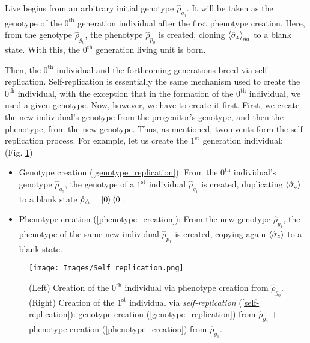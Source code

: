 \documentclass[11pt]{article}
\numberwithin{equation}{section} %
\numberwithin{figure}{section} %
\begin{document}
Live begins from an arbitrary initial genotype $\hat{\rho}_{g_0}$. It will be taken as the genotype of the $0^{\textrm{th}}$ generation individual after the first {\color{orange}phenotype creation}. Here, from the genotype $\hat{\rho}_{g_0}$, the phenotype $\hat{\rho}_{p_0}$ is created, cloning $\braket{\hat{\sigma}_z}_{g_0}$ to a blank state. With this, the $0^{\textrm{th}}$ generation living unit is born.

Then, the $0^{\textrm{th}}$ individual and the forthcoming generations breed via self-replication. Self-replication is essentially the same mechanism used to create the $0^{\textrm{th}}$ individual, with the exception that in the formation of the $0^{\textrm{th}}$ individual, we used a given genotype. Now, however, we have to create it first. First, we create the new individual's genotype from the progenitor's genotype, and then the phenotype, from the new genotype. Thus, as mentioned, two events form the self-replication process. For example, let us create the $1^\textrm{st}$ generation individual:      $\,\,\,$ (Fig. \ref{fig:Self_replication})


\begin{itemize}
\item {\color{purple}Genotype creation} (\ref{genotype_replication}): From the $0^{\textrm{th}}$ individual's genotype $\hat{\rho}_{g_0}$, the genotype of a $1^\textrm{st}$ individual $\hat{\rho}_{g_1}$ is created, duplicating $\braket{\hat{\sigma}_z}$ to a blank state $\hat{\rho}_A=\ket{0}\bra{0}$. $\,$  \cite[p.~2, l.~19-20]{QAL_IBM}

\item {\color{orange}Phenotype creation} (\ref{phenotype_creation}): From the new genotype $\hat{\rho}_{g_1}$, the phenotype of the same new individual $\hat{\rho}_{p_1}$ is created, copying again $\braket{\hat{\sigma}_z}$ to a blank state. $\,$ \cite[p.~2, l.~20-22]{QAL_IBM}
\end{itemize}

 \begin{figure}[H] 
	\centering
	\texttt{[image: Images/Self\_replication.png]}
	\caption{(Left) Creation of the $0^\textrm{th}$ individual via {\color{orange}phenotype creation} from $\hat{\rho}_{g_0}$. (Right) Creation of the $1^\textrm{st}$ individual via \emph{self-replication} (\ref{self-replication}): {\color{purple}genotype creation} (\ref{genotype_replication}) from $\hat{\rho}_{g_0}$ $+$ {\color{orange}phenotype creation} (\ref{phenotype_creation}) from $\hat{\rho}_{g_1}$.}
 \label{fig:Self_replication}
\end{figure}
\end{document}
